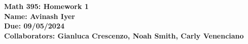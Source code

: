 \documentclass[10pt]{mypackage}
\renewcommand*{\mathbb}[1]{\varmathbb{#1}}
\begin{document}
\begin{center}
  \large
  \bfseries
  Math 395: Homework 1\\
  Name: Avinash Iyer\\
  Due: 09/05/2024\\
  Collaborators: Gianluca Crescenzo, Noah Smith, Carly Venenciano
\end{center}
\RaggedRight
%
\end{document}
